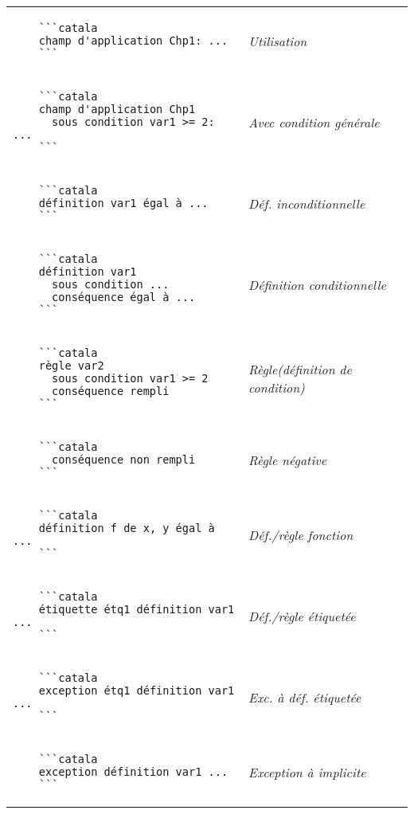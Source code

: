 \documentclass{article}
\makeatletter
\newenvironment{catala}{%
  \VerbatimEnvironment
  \let\FV@ListVSpace\relax
  \begin{verbatim}}%
 {\end{verbatim}}
\makeatother
\begin{document}
\begin{multicols}{3}
\begin{tabular}{@{}p{\cola}>{\slshape}p{\colb}@{}}
  \begin{catala}
    ```catala
    champ d'application Chp1: ...
    ```
  \end{catala}
  & Utilisation
  \\
  \begin{catala}
    ```catala
    champ d'application Chp1
      sous condition var1 >= 2: ...
    ```
  \end{catala}
  & Avec condition générale
  \\
  \begin{catala}
    ```catala
    définition var1 égal à ...
    ```
  \end{catala}
  & Déf. inconditionnelle
  \\
  \begin{catala}
    ```catala
    définition var1
      sous condition ...
      conséquence égal à ...
    ```
  \end{catala}
  & Définition conditionnelle
  \\
  \begin{catala}
    ```catala
    règle var2
      sous condition var1 >= 2
      conséquence rempli
    ```
  \end{catala}
  & Règle\newline(définition de condition)
  \\
  \begin{catala}
    ```catala
      conséquence non rempli
    ```
  \end{catala}
  & Règle négative
  \\
  \begin{catala}
    ```catala
    définition f de x, y égal à ...
    ```
  \end{catala}
  & Déf./règle fonction
  \\
  \begin{catala}
    ```catala
    étiquette étq1 définition var1 ...
    ```
  \end{catala}
  & Déf./règle étiquetée
  \\
  \begin{catala}
    ```catala
    exception étq1 définition var1 ...
    ```
  \end{catala}
  & Exc. à déf. étiquetée
  \\
  \begin{catala}
    ```catala
    exception définition var1 ...
    ```
  \end{catala}
  & Exception à implicite
  \\

\end{tabular}
\end{multicols}
\end{document}
